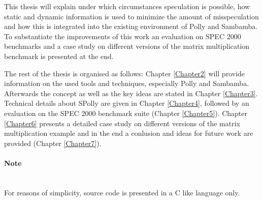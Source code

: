 This thesis will explain under which circumstances speculation is possible,
how static and dynamic information is used to minimize the amount of
misspeculation and how this is integrated into the existing environment of 
Polly and Sambamba. To substantiate the improvements of this work an evaluation on 
SPEC 2000 benchmarks and a case study on different versions of
the matrix multiplication benchmark is presented at the end.




The rest of the thesis is organised as follows:
Chapter \ref{Chapter2} will provide information on the used tools and techniques,
especially Polly and Sambamba. Afterwards the concept as well as the key ideas 
are stated in Chapter \ref{Chapter3}. 
Technical details about SPolly are given in Chapter \ref{Chapter4}, followed by 
an evaluation on the SPEC 2000 benchmark suite (Chapter \ref{Chapter5}). 
Chapter \ref{Chapter6} presents a detailed case study on different 
versions of the matrix multiplication example and in the end 
a conlusion and ideas for future work are provided (Chapter \ref{Chapter7}).

\paragraph*{Note} ~ \\
For reasons of simplicity, source code is presented in a C like language only.




